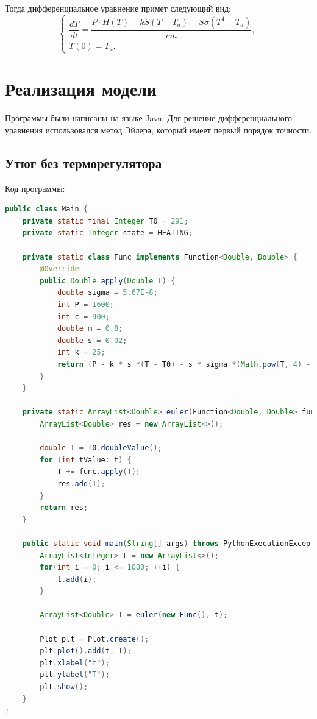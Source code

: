 \documentclass[a4paper, 14pt]{extarticle}
\begin{document}
		Тогда дифференциальное уравнение примет следующий вид:
		\[
		\begin{cases}
			\dfrac{dT}{dt} = \dfrac{ P\cdot H(T) - kS(T-T_a) - S \sigma (T^4 - T_a)}{cm},\\
			T(0) = T_a.
		\end{cases} \tag{2} \label{eq:2}
		\]
	
	\section{Реализация модели}
		\setlength\parindent{0pt}
		Программы были написаны на языке Java. Для решение дифференциального уравнения
		использовался метод Эйлера, который имеет первый порядок точности.
		\subsection{Утюг без терморегулятора}
			Код программы:
			\begin{lstlisting}[language=Java]
public class Main {
	private static final Integer T0 = 291;
	private static Integer state = HEATING;
	
	private static class Func implements Function<Double, Double> {
		@Override
		public Double apply(Double T) {
			double sigma = 5.67E-8;
			int P = 1600;
			int c = 900;
			double m = 0.8;
			double s = 0.02;
			int k = 25;
			return (P - k * s *(T - T0) - s * sigma *(Math.pow(T, 4) - Math.pow(T0, 4))) / c * m;
		}
	}
	
	private static ArrayList<Double> euler(Function<Double, Double> func, ArrayList<Integer> t) {
		ArrayList<Double> res = new ArrayList<>();
		
		double T = T0.doubleValue();
		for (int tValue: t) {
			T += func.apply(T);
			res.add(T);
		}
		return res;
	}
	
	public static void main(String[] args) throws PythonExecutionException, IOException {
		ArrayList<Integer> t = new ArrayList<>();
		for(int i = 0; i <= 1000; ++i) {
			t.add(i);
		}
		
		ArrayList<Double> T = euler(new Func(), t);
		
		Plot plt = Plot.create();
		plt.plot().add(t, T);
		plt.xlabel("t");
		plt.ylabel("T");
		plt.show();
	}
}
			\end{lstlisting}
\end{document}
